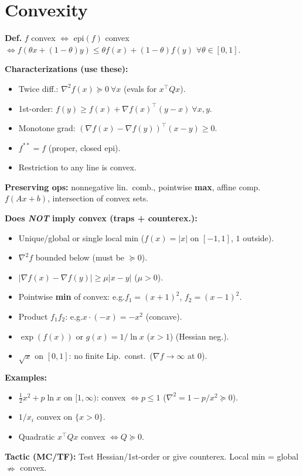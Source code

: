 
\section*{Convexity }
\textbf{Def.} \(f\) convex \(\iff\) epi\((f)\) convex \(\iff f(\theta
x+(1-\theta)y)\le\theta f(x)+(1-\theta)f(y)\) \(\forall\theta\in[0,1]\).

\textbf{Characterizations (use these):}
\begin{itemize}[leftmargin=*,itemsep=-1pt]
  \item Twice diff.: \(\nabla^2 f(x)\succeq0\ \forall x\) (evals for
    \(x^\top Qx\)).
  \item 1st-order: \(f(y)\ge f(x)+\nabla f(x)^\top(y-x)\ \forall x,y\).
  \item Monotone grad: \((\nabla f(x)-\nabla f(y))^\top(x-y)\ge0\).
  \item \(f^{**}=f\) (proper, closed epi).
  \item Restriction to any line is convex.
\end{itemize}

\textbf{Preserving ops:} nonnegative lin.\ comb., pointwise
\textbf{max}, affine comp.\(f(Ax+b)\), intersection of convex sets.

\textbf{Does \emph{NOT} imply convex (traps + counterex.):}
\begin{itemize}[leftmargin=*,itemsep=-1pt]
  \item Unique/global or single local min (\(f(x)=|x|\) on
    \([-1,1]\), \(1\) outside).
  \item \(\nabla^2 f\) bounded below (must be \(\succeq0\)).
  \item \(|\nabla f(x)-\nabla f(y)|\ge\mu|x-y|\) (\(\mu>0\)).
  \item Pointwise \textbf{min} of convex: e.g.\(f_1=(x+1)^2\), \(f_2=(x-1)^2\).
  \item Product \(f_1f_2\): e.g.\(x\cdot(-x)=-x^2\) (concave).
  \item \(\exp(f(x))\) or \(g(x)=1/\ln x\) (\(x>1\)) (Hessian neg.).
  \item \(\sqrt{x}\) on \([0,1]\): no finite Lip.\ const.\ (\(\nabla
    f\to\infty\) at 0).
\end{itemize}

\textbf{Examples:}
\begin{itemize}[leftmargin=*,itemsep=-1pt]
  \item \(\frac12 x^2 + p\ln x\) on \([1,\infty)\): convex \(\iff
    p\le1\) (\(\nabla^2=1-p/x^2\succeq0\)).
  \item \(1/x_i\) convex on \(\{x>0\}\).
  \item Quadratic \(x^\top Qx\) convex \(\iff Q\succeq0\).
\end{itemize}
\textbf{Tactic (MC/TF):} Test Hessian/1st-order or give counterex.
Local min = global \(\nRightarrow\) convex.

